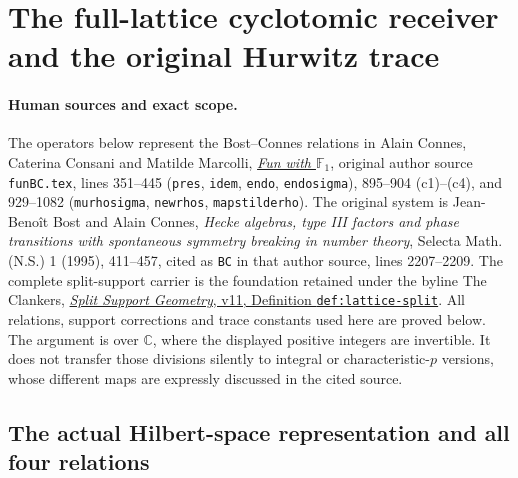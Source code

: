 \section{The full-lattice cyclotomic receiver and the original Hurwitz trace}
\label{sec:hurwitz-cyclotomic-receiver}

\paragraph{Human sources and exact scope.}
The operators below represent the Bost--Connes relations in Alain
Connes, Caterina Consani and Matilde Marcolli,
\href{https://arxiv.org/abs/0806.2401v1}{\emph{Fun with $\mathbb F_1$}},
original author source \texttt{funBC.tex}, lines 351--445
(\texttt{pres}, \texttt{idem}, \texttt{endo}, \texttt{endosigma}),
895--904 (c1)--(c4), and 929--1082 (\texttt{murhosigma},
\texttt{newrhos}, \texttt{mapstilderho}). The original system is
Jean-Beno\^it Bost and Alain Connes, \emph{Hecke algebras, type III
factors and phase transitions with spontaneous symmetry breaking in
number theory}, Selecta Math. (N.S.) 1 (1995), 411--457, cited as
\texttt{BC} in that author source, lines 2207--2209.
The complete split-support carrier is the foundation retained under
the byline The Clankers,
\href{https://github.com/KokunoYumeto/zeta-function-research-reader/blob/a2851f9eb352e7e4376bc629de86fa4ed9c1c434/workbenches/splitzero-tandem/foundations/split-support-geometry-v11/split_support_geometry_arithmetic_curve_v11.tex}{\emph{Split Support Geometry}, v11, Definition \texttt{def:lattice-split}}.
All relations, support corrections and trace constants used here
are proved below. The argument is over $\mathbb C$, where the
displayed positive integers are invertible. It does not transfer
those divisions silently to integral or characteristic-$p$ versions,
whose different maps are expressly discussed in the cited source.

\subsection{The actual Hilbert-space representation and all four relations}

